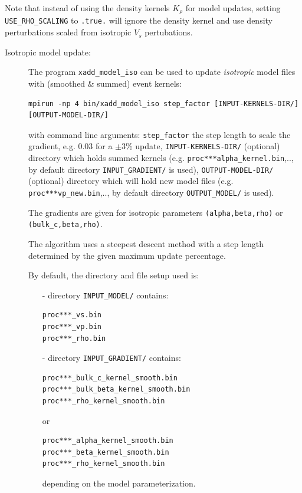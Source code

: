 Note that instead of using the density kernels $K_{\rho}$ for model updates, setting \texttt{USE\_RHO\_SCALING} to \texttt{.true.} will
ignore the density kernel and use density perturbations scaled from isotropic $V_s$ pertubations.\newline

\begin{description}
\item [Isotropic model update:] The program \texttt{xadd\_model\_iso} can be used to update {\it isotropic} model files with
(smoothed \& summed) event kernels:
\begin{verbatim}
mpirun -np 4 bin/xadd_model_iso step_factor [INPUT-KERNELS-DIR/] [OUTPUT-MODEL-DIR/]
\end{verbatim}
with command line arguments:
\texttt{step\_factor} the step length to scale the gradient, e.g. $0.03$ for a $\pm 3$\% update,
\texttt{INPUT-KERNELS-DIR/} (optional) directory which holds summed kernels (e.g. \texttt{proc***alpha\_kernel.bin},.., by default
directory \texttt{INPUT\_GRADIENT/} is used),
\texttt{OUTPUT-MODEL-DIR/} (optional) directory which will hold new model files (e.g. \texttt{proc***vp\_new.bin},.., by default directory
\texttt{OUTPUT\_MODEL/} is used).\newline

The gradients are given for isotropic parameters \texttt{(alpha,beta,rho)} or \texttt{(bulk\_c,beta,rho)}.\newline

The algorithm uses a steepest descent method with a step length
determined by the given maximum update percentage.\newline

By default, the directory and file setup used is:
\begin{itemize}
\item [-] directory \texttt{INPUT\_MODEL/} contains:
\begin{verbatim}
proc***_vs.bin
proc***_vp.bin
proc***_rho.bin
\end{verbatim}

\item [-] directory \texttt{INPUT\_GRADIENT/} contains:
\begin{verbatim}
proc***_bulk_c_kernel_smooth.bin
proc***_bulk_beta_kernel_smooth.bin
proc***_rho_kernel_smooth.bin
\end{verbatim}
or
\begin{verbatim}
proc***_alpha_kernel_smooth.bin
proc***_beta_kernel_smooth.bin
proc***_rho_kernel_smooth.bin
\end{verbatim}
depending on the model parameterization.


\end{itemize}
\end{description}
